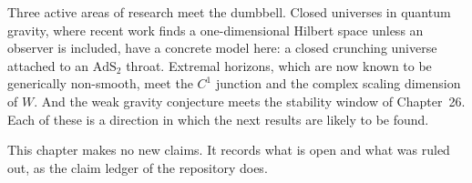 Three active areas of research meet the dumbbell. Closed universes in quantum gravity, where recent work finds a one-dimensional Hilbert space unless an observer is included, have a concrete model here: a closed crunching universe attached to an $\mathrm{AdS}_2$ throat. Extremal horizons, which are now known to be generically non-smooth, meet the $C^1$ junction and the complex scaling dimension of $W$. And the weak gravity conjecture meets the stability window of Chapter~26. Each of these is a direction in which the next results are likely to be found.

\begin{standsbox}
This chapter makes no new claims. It records what is open and what was ruled out, as the claim ledger of the repository does.
\end{standsbox}
